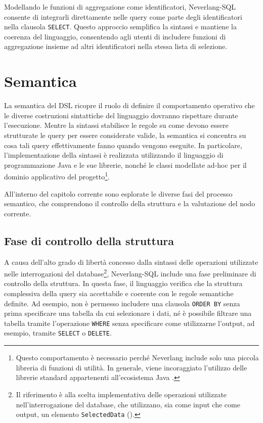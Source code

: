 \documentclass[12pt,a4paper,openright,twoside]{book}
\begin{document}
Modellando le funzioni di aggregazione come identificatori, Neverlang-SQL consente di integrarli direttamente nelle query come 
parte degli identificatori nella clausola \texttt{SELECT}. Questo approccio semplifica la sintassi e mantiene la coerenza del 
linguaggio, consentendo agli utenti di includere funzioni di aggregazione insieme ad altri identificatori nella stessa lista di 
selezione.

\section{Semantica}
La semantica del DSL ricopre il ruolo di definire il comportamento operativo che le diverse costruzioni sintattiche del linguaggio dovranno 
rispettare durante l’esecuzione. Mentre la sintassi stabilisce le regole su come devono essere strutturate le query per essere considerate 
valide, la semantica si concentra su cosa tali query effettivamente fanno quando vengono eseguite. In particolare, l’implementazione della 
sintassi è realizzata utilizzando il linguaggio di programmazione Java e le sue librerie, nonché le classi modellate ad-hoc per il dominio 
applicativo del progetto\footnote{Questo comportamento è necessario perché Neverlang include solo una piccola libreria di funzioni di 
utilità. In generale, viene incoraggiato l’utilizzo delle librerie standard appartenenti all’ecosistema Java \cite{Vacchi2015}.}.

All’interno del capitolo corrente sono esplorate le diverse fasi del processo semantico, che comprendono il controllo della struttura e
la valutazione del nodo corrente.

\subsection{Fase di controllo della struttura}
A causa dell’alto grado di libertà concesso dalla sintassi delle operazioni utilizzate nelle interrogazioni del database\footnote{Il 
riferimento è alla scelta implementativa delle operazioni utilizzate nell’interrogazione del database, che utilizzano, sia come input che 
come output, un elemento \texttt{SelectedData} ().}, Neverlang-SQL include una fase preliminare di 
controllo della struttura. In questa fase, il linguaggio verifica che la struttura complessiva della query sia accettabile e coerente con le 
regole semantiche definite. Ad esempio, non è permesso includere una clausola \texttt{ORDER BY} senza prima specificare una tabella da cui 
selezionare i dati, né è possibile filtrare una tabella tramite l’operazione \texttt{WHERE} senza specificare come utilizzarne l’output, ad 
esempio, tramite \texttt{SELECT} o \texttt{DELETE}.
\end{document}
